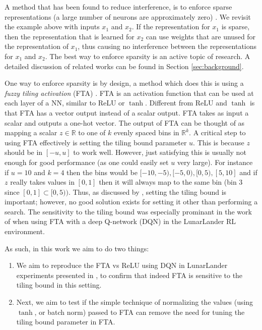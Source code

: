 \documentclass{article}
\newcommand{\RR}{\mathbb{R}}
\begin{document}
A method that has been found to reduce interference, is to enforce sparse representations (a large number of neurons are approximately zero) \cite[]{liu2019,javed2019,rafati2019learning}.
We revisit the example above with inputs $x_1$ and $x_2$.
If the representation for $x_1$ is sparse, then the representation that is learned for $x_2$ can use weights that are unused for the representation of $x_1$, 
thus causing no interference between the representations for $x_1$ and $x_2$.
The best way to enforce sparsity is an active topic of research.
A detailed discussion of related works can be found in Section \ref{sec:background}.

One way to enforce sparsity is by design, a method which does this is using a \textit{fuzzy tiling activation} (FTA) \cite[]{pan2019fuzzy}.
FTA is an activation function that can be used at each layer of a NN, similar to ReLU or $\tanh$.
Different from ReLU and $\tanh$ is that FTA has a vector output instead of a scalar output.
FTA takes as input a scalar and outputs a one-hot vector.
The output of FTA can be thought of as mapping a scalar $z \in \RR$ to one of $k$ evenly spaced bins in $\RR^k$.
A critical step to using FTA effectively is setting the tiling bound parameter $u$.
This is because $z$ should be in $[-u, u]$ to work well. 
However, just satisfying this is usually not enough for good performance (as one could easily set $u$ very large).
For instance if $u = 10$ and $k = 4$ then the bins would be $[-10, -5), [-5, 0), [0, 5), [5, 10]$ 
and if $z$ really takes values in $[0,1]$ then it will always map to the same bin (bin $3$ since $[0, 1] \subset [0, 5))$.
Thus, as discussed by \cite[]{pan2019fuzzy}, setting the tiling bound is important; however, no good solution exists for setting it other than performing a search.
The sensitivity to the tiling bound was especially prominant in the work of \cite[]{pan2019fuzzy} when using FTA with a deep Q-network (DQN) \cite[]{mnih2013playing} in the LunarLander RL environment.

As such, in this work we aim to do two things:
\begin{enumerate}
  \item We aim to reproduce the FTA vs ReLU using DQN in LunarLander experiments presented in \cite[]{pan2019fuzzy}, to confirm that indeed FTA is sensitive to the tiling bound in this setting.
  \item Next, we aim to test if the simple technique of normalizing the values (using $\tanh$, or batch norm) passed to FTA can remove the need for tuning the tiling bound parameter in FTA.
\end{enumerate}
\end{document}
